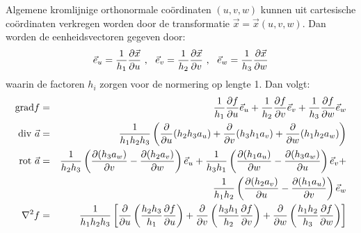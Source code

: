 Algemene kromlijnige orthonormale co\"ordinaten $(u,v,w)$ kunnen uit
cartesische co\"ordinaten verkregen worden door de transformatie
$\vec{x}=\vec{x}(u,v,w)$. Dan worden de eenheidsvectoren gegeven door:
\[
\vec{e}_{u}=\frac{1}{h_1}\frac{\partial \vec{x}}{\partial u}~,~~\vec{e}_{v}=\frac{1}{h_2}\frac{\partial \vec{x}}{\partial v}~,~~
\vec{e}_{w}=\frac{1}{h_3}\frac{\partial \vec{x}}{\partial w}
\]
waarin de factoren $h_i$ zorgen voor de normering op lengte 1. Dan volgt:
\begin{eqnarray*}
{\rm grad}f   &=&\frac{1}{h_1}\frac{\partial f}{\partial u}\vec{e}_{u}+\frac{1}{h_2}\frac{\partial f}{\partial v}\vec{e}_{v}+\frac{1}{h_3}\frac{\partial f}{\partial w}\vec{e}_{w}\\
{\rm div}~\vec{a}&=&\frac{1}{h_1h_2h_3}\left(\frac{\partial }{\partial u}(h_2h_3a_u)+\frac{\partial }{\partial v}(h_3h_1a_v)+\frac{\partial }{\partial w}(h_1h_2a_w)\right)\\
{\rm rot}~\vec{a}&=&\frac{1}{h_2h_3}\left(\frac{\partial (h_3a_w)}{\partial v}-\frac{\partial (h_2a_v)}{\partial w}\right)\vec{e}_{u}+
                 \frac{1}{h_3h_1}\left(\frac{\partial (h_1a_u)}{\partial w}-\frac{\partial (h_3a_w)}{\partial u}\right)\vec{e}_{v}+\\
               &&\frac{1}{h_1h_2}\left(\frac{\partial (h_2a_v)}{\partial u}-\frac{\partial (h_1a_u)}{\partial v}\right)\vec{e}_{w}\\
\nabla^2 f    &=&\frac{1}{h_1h_2h_3}\left[\frac{\partial }{\partial u}\left(\frac{h_2h_3}{h_1}\frac{\partial f}{\partial u}\right)+
                 \frac{\partial }{\partial v}\left(\frac{h_3h_1}{h_2}\frac{\partial f}{\partial v}\right)+
                 \frac{\partial }{\partial w}\left(\frac{h_1h_2}{h_3}\frac{\partial f}{\partial w}\right)\right]
\end{eqnarray*}

\newpage
{}

